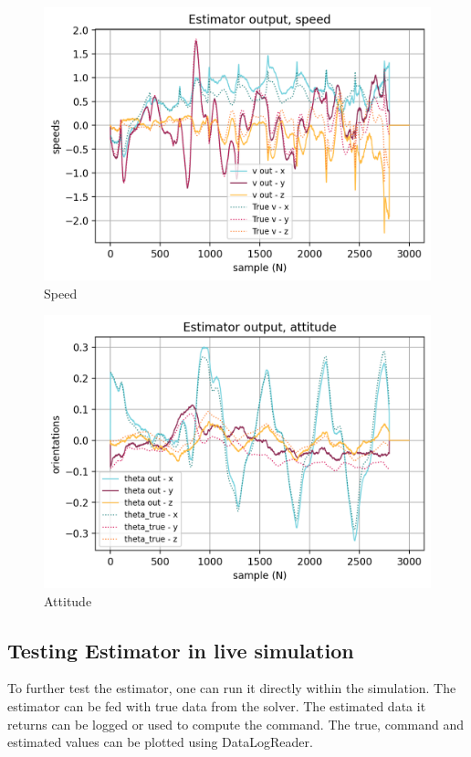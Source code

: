\documentclass[a4paper,10pt]{article}
\begin{document}
\begin{figure}[H]
\centering
  \includegraphics[width=\linewidth, angle=0, scale=0.8]{./images/resultat_simu_speed.png}
  \caption{Speed}
\end{figure}

\begin{figure}[H]
\centering
  \includegraphics[width=\linewidth, angle=0, scale=0.8]{./images/resultat_simu_attitude.png}
  \caption{Attitude}
\end{figure}





\subsection{Testing Estimator in live simulation}
To further test the estimator, one can run it directly within the simulation. The estimator can be fed with true data from the solver. The estimated data it returns can be logged or used to compute the command. The true, command and estimated values can be plotted using DataLogReader.
\end{document}
